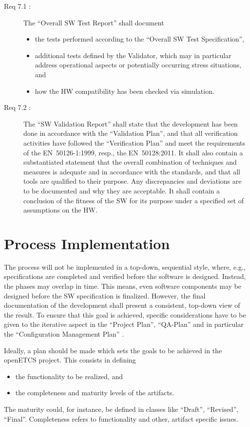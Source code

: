 \documentclass{template/openetcs_article}
\begin{document}
\begin{description}
\item[Req 7.1 {\cite[7.7.4.1 to 7.7.4.4]{EN50128:2011}}:] The
  ``Overall SW Test Report'' shall document
  \begin{itemize}
  \item the tests performed according to the ``Overall SW Test
    Specification'',
  \item additional tests defined by the Validator, which may in
    particular address operational aspects or potentially occurring
    stress situations, and
  \item how the HW compatibility has been checked via simulation.
  \end{itemize}
%
\item[Req 7.2 {\cite[7.7.4.6 to 7.7.4.11]{EN50128:2011}}:] The ``SW
  Validation Report'' shall state that the development has been done
  in accordance with the ``Validation Plan'', and that all
  verification activities have followed the ``Verification Plan'' and
  meet the requirements of the EN~50126-1:1999, resp., the
  EN~50128:2011. It shall also contain a substantiated statement that
  the overall combination of techniques and measures is adequate and
  in accordance with the standards, and that all tools are qualified
  to their purpose. Any discrepancies and deviations are to be
  documented and why they are acceptable. It shall contain a
  conclusion of the fitness of the SW for its purpose under a
  specified set of assumptions on the HW.
\end{description}

\section{Process Implementation}
\label{sec:proc-impl}

The process will not be implemented in a top-down, sequential style,
where, e.g., specifications are completed and verified before the
software is designed. Instead, the phases may overlap in time. This
means, even software components may be designed before the SW
specification is finalized. However, the final documentation of the
development shall present a consistent, top-down view of the
result. To ensure that this goal is achieved, specific considerations
have to be given to the iterative aspect in the ``Project Plan'',
``QA-Plan'' and in particular the ``Configuration Management Plan'' .


Ideally, a plan should be made which sets the goals to be achieved
in the openETCS project. This consists in defining  
\begin{itemize}
\item the functionality to be realized, and
\item the completeness and maturity levels of the artifacts. 
\end{itemize}
The maturity could, for instance, be defined in classes like
``Draft'', ``Revised'', ``Final''. Completeness refers to
functionality and other, artifact specific issues. 
\end{document}
